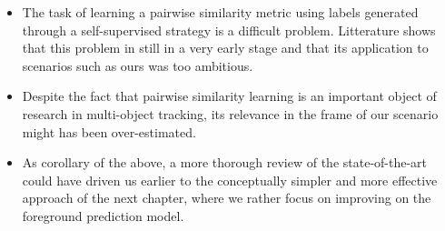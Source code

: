 \begin{itemize}
    \item The task of learning a pairwise similarity metric using labels generated through a self-supervised strategy is a difficult problem. Litterature shows that this problem in still in a very early stage and that its application to scenarios such as ours was too ambitious.
    \item Despite the fact that pairwise similarity learning is an important object of research in multi-object tracking, its relevance in the frame of our scenario might has been over-estimated.
    \item As corollary of the above, a more thorough review of the state-of-the-art could have driven us earlier to the conceptually simpler and more effective approach of the next chapter, where we rather focus on improving on the foreground prediction model.
\end{itemize}


